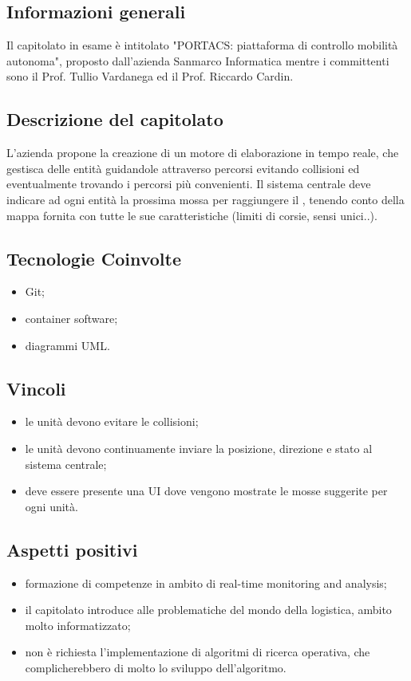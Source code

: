 \subsection{Informazioni generali}
Il capitolato in esame è intitolato "PORTACS: piattaforma di controllo mobilità autonoma", proposto dall'azienda Sanmarco Informatica mentre i committenti sono il Prof. Tullio Vardanega ed il Prof. Riccardo Cardin.
\subsection{Descrizione del capitolato}
L'azienda propone la creazione di un motore di elaborazione in tempo reale, che gestisca delle entità guidandole attraverso percorsi evitando collisioni ed eventualmente trovando i percorsi più convenienti.
Il sistema centrale deve indicare ad ogni entità la prossima mossa per raggiungere il , tenendo conto della mappa fornita con tutte le sue caratteristiche (limiti di corsie, sensi unici..).
\subsection{Tecnologie Coinvolte}
\begin{itemize}
    \item Git;
    \item container software;
    \item diagrammi UML.
\end{itemize}
\subsection{Vincoli}
\begin{itemize}
    \item le unità devono evitare le collisioni;
    \item le unità devono continuamente inviare la posizione, direzione e stato al sistema centrale;
    \item deve essere presente una UI dove vengono mostrate le mosse suggerite per ogni unità.
\end{itemize}
\subsection{Aspetti positivi}
\begin{itemize}
    \item formazione di competenze in ambito di real-time monitoring and analysis;
    \item il capitolato introduce alle problematiche del mondo della logistica, ambito molto informatizzato;
    \item non è richiesta l'implementazione di algoritmi di ricerca operativa, che complicherebbero di molto lo sviluppo dell'algoritmo.
\end{itemize}
